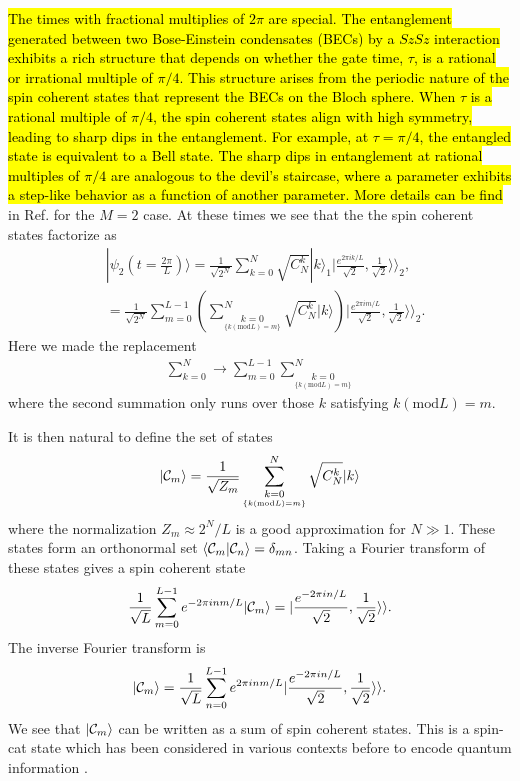 \documentclass[%
  prx,%
  twocolumn,%
  preprintnumbers,%
  amsmath,%
  amssymb,%
  superscriptaddress%
]{revtex4}
\begin{document}
\hl{The times with fractional multiplies of $ 2 \pi  $ are special. The entanglement generated between two Bose-Einstein condensates (BECs) by a $SzSz$ interaction exhibits a rich structure that depends on whether the gate time, $\tau$, is a rational or irrational multiple of $\pi/4$. This structure arises from the periodic nature of the spin coherent states that represent the BECs on the Bloch sphere. When $\tau$ is a rational multiple of $\pi/4$, the spin coherent states align with high symmetry, leading to sharp dips in the entanglement. For example, at $\tau = \pi/4$, the entangled state is equivalent to a Bell state. The sharp dips in entanglement at rational multiples of $\pi/4$ are analogous to the devil's staircase, where a parameter exhibits a step-like behavior as a function of another parameter.  More details can be find} in Ref.  \cite{byrnes2013fractality} for the $M = 2 $ case. At these times we see that the the spin coherent states factorize as
%
\begin{align}
&|\psi_2 (t= \frac{2\pi}{L} )  \rangle=\frac{1}{\sqrt{2^N}}\sum_{k=0}^N \sqrt{C_{N}^{k}}|k\rangle_1  |\frac{e^{2 \pi i k/L }}{\sqrt{2}},\frac{1}{\sqrt{2}}\rangle\rangle_2 ,  \label{firstlinepsi2} \\
& = \frac{1}{\sqrt{2^N}} \sum_{m=0}^{L-1} \left(  \sum^N_{  \underset{  \{ k (\text{mod} L ) =m \} }{k=0} }   \sqrt{C_{N}^{k}}|k\rangle  \right)  |\frac{e^{2 \pi i m/L }}{\sqrt{2}},\frac{1}{\sqrt{2}}\rangle\rangle_2 .
\label{M2psiv2}
\end{align}
%
Here we made the replacement
%
\begin{align}
\sum_{k=0}^N \rightarrow \sum_{m=0}^{L-1} \sum^N_{  \underset{  \{ k (\text{mod} L ) =m \} }{k=0} }
\end{align}
%
where the second summation only runs over those $ k $ satisfying $ k (\text{mod} L) = m $.

It is then natural to define the set of states
%
\begin{align}
|{\cal C}_m \rangle = \frac{1}{\sqrt{Z_m}}  \sum^N_{  \underset{  \{ k (\text{mod} L ) =m \} }{k=0} }  \sqrt{C_{N}^{k}}|k\rangle
\end{align}
%
where the normalization $ Z_m \approx 2^N/L $ is a good approximation for $ N \gg 1 $.  These states form an orthonormal set $ \langle {\cal C}_m | {\cal C}_n \rangle = \delta_{mn} $. Taking a Fourier transform of these states gives a spin coherent state
%
\begin{align}
\frac{1}{\sqrt{L}} \sum_{m=0}^{L-1} e^{-2 \pi i n m/L } |{\cal C}_m \rangle  =| \frac{e^{-2 \pi i n /L }}{\sqrt{2}}, \frac{1}{\sqrt{2}} \rangle \rangle .
\end{align}
%
The inverse Fourier transform is
%
\begin{align}
|{\cal C}_m \rangle = \frac{1}{\sqrt{L}} \sum_{n=0}^{L-1}
e^{2 \pi i n m/L } | \frac{e^{-2 \pi i n /L }}{\sqrt{2}}, \frac{1}{\sqrt{2}} \rangle \rangle .
\label{invfouriercat}
\end{align}
%
We see that $ |{\cal C}_m \rangle$ can be written as a sum of spin coherent states.  This is a spin-cat state which has been considered in various contexts before to encode quantum information \cite{agarwal1997atomic,semenenko2016implementing,qin2021generating,omanakuttan2024fault}.
\end{document}
